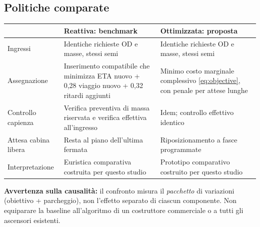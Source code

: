 \documentclass[11pt,a4paper]{article}
\begin{document}
\subsection{Politiche comparate}
\begin{tabularx}{\linewidth}{@{}p{35mm}X X@{}}
\toprule
 & \textbf{Reattiva: benchmark} & \textbf{Ottimizzata: proposta}\\
\midrule
Ingressi & Identiche richieste OD e masse, stessi semi & Identiche richieste OD e masse, stessi semi\\
Assegnazione & Inserimento compatibile che minimizza ETA nuovo + 0,28 viaggio nuovo + 0,32 ritardi aggiunti & Minimo costo marginale complessivo \eqref{eq:objective}, con penale per attese lunghe\\
Controllo capienza & Verifica preventiva di massa riservata e verifica effettiva all'ingresso & Idem; controllo effettivo identico\\
Attesa cabina libera & Resta al piano dell'ultima fermata & Riposizionamento a fasce programmate\\
Interpretazione & Euristica comparativa costruita per questo studio & Prototipo comparativo costruito per questo studio\\
\bottomrule
\end{tabularx}
\textbf{Avvertenza sulla causalit\`a:} il confronto misura il \emph{pacchetto} di variazioni (obiettivo + parcheggio), non l'effetto separato di ciascun componente. Non equiparare la baseline all'algoritmo di un costruttore commerciale o a tutti gli ascensori esistenti.
\end{document}
